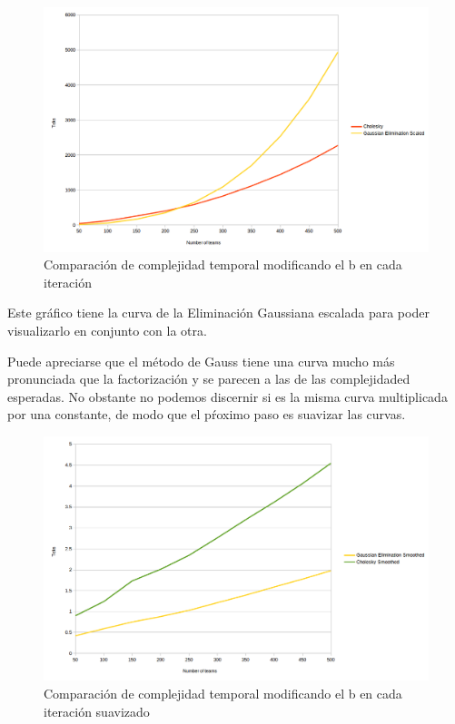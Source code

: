 \begin{figure}[h!]
  \begin{center}
	\includegraphics[scale=0.50]{imagenes/cuantitative/bChange/ColleyMatrixCuantitativeBChangeAnalysis.png}
	\caption{Comparaci\'on de complejidad temporal modificando el b en cada iteraci\'on}
	\label{bChange}
  \end{center}
\end{figure}

Este gr\'afico tiene la curva de la Eliminaci\'on Gaussiana escalada para poder visualizarlo en conjunto con la otra.

Puede apreciarse que el m\'etodo de Gauss tiene una curva mucho m\'as pronunciada que la factorizaci\'on y se parecen a las de las complejidaded esperadas. No obstante no podemos discernir si es la misma curva multiplicada por una constante, de modo que el p\'roximo paso es suavizar las curvas.

\begin{figure}[h!]
  \begin{center}
	\includegraphics[scale=0.50]{imagenes/cuantitative/bChange/ColleyMatrixCuantitativeBChangeAnalysisSmoothed.png}
	\caption{Comparaci\'on de complejidad temporal modificando el b en cada iteraci\'on suavizado}
	\label{bChangeSmoothed}
  \end{center}
\end{figure}

